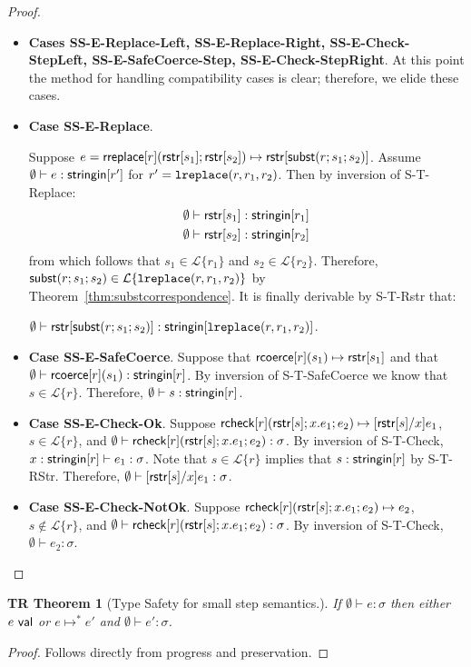 \documentclass[12pt]{article}
\newcommand{\todo}[1]{{\color{red} #1}}
\newtheorem{trthm}[tr]{TR Theorem}
\theoremstyle{definition}
\newcommand{\Lagr}{\mathcal{L}}
\newcommand{\lang}[1]{\Lagr\{#1\}}
\newcommand{\rcoerce}[2]{{\sf rcoerce}[#1](#2)}
\newcommand{\val}{{\sf val}}
\newcommand{\rcheck}[4]{ {\sf rcheck}[#1](#2;#3;#4) }
\newcommand{\stringin}[1]{{\sf stringin}[#1]}
\newcommand{\lsubst}[3]{{\sf subst}(#1;#2;#3)} %
\newcommand{\lreplace}[3]{{\sf lreplace}(#1; #2; #3)}
\renewcommand{\lreplace}[3]{{\tt lreplace}(#1, #2, #3)}
\begin{document}
\begin{proof}
\begin{itemize}[label=$ $,itemsep=1ex]
\item \textbf{Cases SS-E-Replace-Left, SS-E-Replace-Right, SS-E-Check-StepLeft, SS-E-SafeCoerce-Step, SS-E-Check-StepRight}.
\todo{At this point the method for handling compatibility cases is clear; therefore,
we elide these cases.}

\item \textbf{Case SS-E-Replace}.

Suppose $e = \rreplace{r}{\rstr{s_1}}{\rstr{s_2}} \mapsto \rstr{\lsubst{r}{s_1}{s_2}}$.
Assume $\emptyset \vdash e : \stringin{r'}$ for $r' = \lreplace{r}{r_1}{r_2}$.
Then by inversion of S-T-Replace:
\begin{align*}
\emptyset &\vdash \rstr{s_1} : \stringin{r_1} \\
\emptyset &\vdash \rstr{s_2} : \stringin{r_2}
\end{align*}
from which follows that $s_1 \in \lang{r_1}$ and $s_2 \in \lang{r_2}$.
Therefore, $\lsubst{r}{s_1}{s_2} \in \lang{\lreplace{r}{r_1}{r_2}}$ by Theorem~\ref{thm:substcorrespondence}.
It is finally derivable by S-T-Rstr that:

$\emptyset \vdash \rstr{\lsubst{r}{s_1}{s_2}} : \stringin{\lreplace{r}{r_1}{r_2}}$.


\item \textbf{Case SS-E-SafeCoerce}.
Suppose that $\rcoerce{r}{s_1} \mapsto \rstr{s_1}$ and that $\emptyset\vdash \rcoerce{r}{s_1} : \stringin{r}$.
By inversion of S-T-SafeCoerce we know that $s \in \lang{r}$. Therefore, $\emptyset\vdash s : \stringin{r}$.

\item \textbf{Case SS-E-Check-Ok}.
Suppose $\rcheck{r}{\rstr{s}}{x.e_1}{e_2} \mapsto \subst{\rstr{s}}{x}{e_1}$,
$s \in \lang{r}$, and $\emptyset \vdash \rcheck{r}{\rstr{s}}{x.e_1}{e_2} : \sigma$.
By inversion of S-T-Check, $x : \stringin{r} \vdash e_1 : \sigma$.
Note that $s \in \lang{r}$ implies that $s : \stringin{r}$ by S-T-RStr.
Therefore, $\emptyset \vdash [{\sf rstr}[s]/x]e_1 : \sigma$.

\item \textbf{Case SS-E-Check-NotOk}.
Suppose $\rcheck{r}{\rstr{s}}{x.e_1}{e_2} \mapsto e_2$,
$s \not \in \lang{r}$, and $\emptyset \vdash \rcheck{r}{\rstr{s}}{x.e_1}{e_2} : \sigma$.
By inversion of S-T-Check, $\emptyset \vdash e_2 : \sigma$.

\end{itemize}
\end{proof}


\begin{trthm}[Type Safety for small step semantics.] \label{thm:sstypesafte}
If $\emptyset\vdash e : \sigma$ then either $e \ \val$ or $e \mapsto^* e'$ and $\emptyset\vdash e' : \sigma$.
\end{trthm}
\begin{proof}
Follows directly from progress and preservation.
\end{proof}
\end{document}
